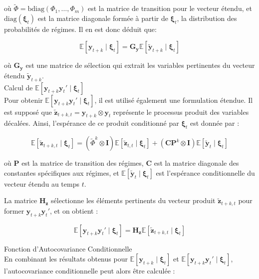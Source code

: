 \begin{sloppypar}
où \(\tilde{\Phi} = \text{bdiag}(\Phi_1, \dots, \Phi_m)\) est la matrice de transition pour le vecteur étendu, et \(\text{diag}(\boldsymbol{\xi}_t)\) est la matrice diagonale formée à partir de \(\boldsymbol{\xi}_t\), la distribution des probabilités de régimes. Il en est donc déduit que:

\[
\mathbb{E}[\mathbf{y}_{t+k} \mid \boldsymbol{\xi}_t] = \mathbf{G}_\mathbf{y} \mathbb{E}[\tilde{\mathbf{y}}_{t+k} \mid \boldsymbol{\xi}_t]
\]

où \(\mathbf{G}_\mathbf{y}\) est une matrice de sélection qui extrait les variables pertinentes du vecteur étendu \(\tilde{\mathbf{y}}_{t+k}\).\\

Calcul de \(\mathbb{E}[\mathbf{y}_{t+k} \mathbf{y}_t' \mid \boldsymbol{\xi}_t]\)
\\

Pour obtenir \(\mathbb{E}[\mathbf{y}_{t+k} \mathbf{y}_t' \mid \boldsymbol{\xi}_t]\), il est utilisé également une formulation étendue. Il est supposé que \(\tilde{\mathbf{z}}_{t+k,t} = \mathbf{y}_{t+k} \otimes \mathbf{y}_t\) représente le processus produit des variables décalées. Ainsi, l'espérance de ce produit conditionné par \(\boldsymbol{\xi}_t\) est donnée par :

\[
\mathbb{E}[\tilde{\mathbf{z}}_{t+k,t} \mid \boldsymbol{\xi}_t] = (\tilde{\Phi}^k \otimes \mathbf{I}) \mathbb{E}[\tilde{\mathbf{z}}_{t,t} \mid \boldsymbol{\xi}_t] + (\mathbf{C} \mathbf{P}^k \otimes \mathbf{I}) \mathbb{E}[\tilde{\mathbf{y}}_t \mid \boldsymbol{\xi}_t]
\]

où \(\mathbf{P}\) est la matrice de transition des régimes, \(\mathbf{C}\) est la matrice diagonale des constantes spécifiques aux régimes, et \(\mathbb{E}[\tilde{\mathbf{y}}_t \mid \boldsymbol{\xi}_t]\) est l'espérance conditionnelle du vecteur étendu au temps \(t\).

La matrice \(\mathbf{H}_{\mathbf{z}}\) sélectionne les éléments pertinents du vecteur produit \(\tilde{\mathbf{z}}_{t+k,t}\) pour former \(\mathbf{y}_{t+k} \mathbf{y}_t'\), et on obtient :

\[
\mathbb{E}[\mathbf{y}_{t+k} \mathbf{y}_t' \mid \boldsymbol{\xi}_t] = \mathbf{H}_{\mathbf{z}} \mathbb{E}[\tilde{\mathbf{z}}_{t+k,t} \mid \boldsymbol{\xi}_t]
\] 

Fonction d'Autocovariance Conditionnelle
\\

En combinant les résultats obtenus pour \(\mathbb{E}[\mathbf{y}_{t+k} \mid \boldsymbol{\xi}_t]\) et \(\mathbb{E}[\mathbf{y}_{t+k} \mathbf{y}_t' \mid \boldsymbol{\xi}_t]\), l'autocovariance conditionnelle peut alors être calculée :


\end{sloppypar}
